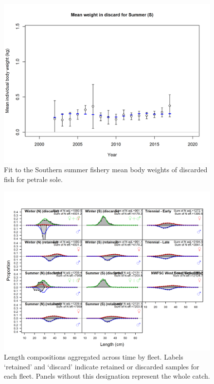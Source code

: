 \documentclass[12pt,]{article}
\begin{document}
\FloatBarrier

\begin{figure}
\centering
\includegraphics{r4ss/plots_mod1/bodywt_fit_fltSummer (S).png}
\caption{Fit to the Southern summer fishery mean body weights of
discarded fish for petrale sole. \label{fig:ss_bodywt_fit}}
\end{figure}

\FloatBarrier

\begin{figure}
\centering
\includegraphics{r4ss/plots_mod1/comp_lenfit__aggregated_across_time.png}
\caption{Length compositions aggregated across time by fleet. Labels
`retained' and `discard' indicate retained or discarded samples for each
fleet. Panels without this designation represent the whole catch.
\label{fig:length_agg}}
\end{figure}
\end{document}
